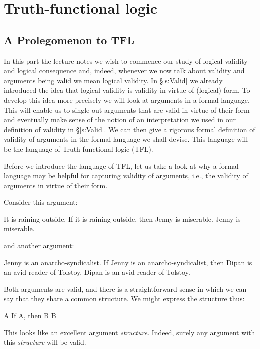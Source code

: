 \part{Truth-functional logic}
\label{ch.TFL}
 
\chapter{A Prolegomenon to TFL}
In this part the lecture notes we wish to commence our study of logical validity and logical consequence and, indeed, whenever we now talk about validity and arguments being valid we mean logical validity. In \S\ref{s:Valid} we already introduced the idea that logical validity is validity in virtue of (logical) form. To develop this idea more precisely we will look at arguments in a formal language. This will enable us to single out arguments that are valid in virtue of their form and eventually make sense of the notion of an interpretation we used in our definition of validity in \S\ref{s:Valid}. We can then give a rigorous formal definition of validity of arguments in the formal language we shall devise. This language will be the language of Truth-functional logic (TFL).

Before we introduce the language of TFL, let us take a look at why a formal language may be helpful for capturing validity of arguments, i.e., the validity of arguments in virtue of their form.

Consider this argument:
	\begin{earg}
		\prem It is raining outside.
		\prem If it is raining outside, then Jenny is miserable.
		\conc Jenny is miserable.
	\end{earg}
and another argument:
	\begin{earg}
		\prem Jenny is an anarcho-syndicalist.
		\prem If Jenny is an anarcho-syndicalist, then Dipan is an avid reader of Tolstoy.
		\conc Dipan is an avid reader of Tolstoy.
	\end{earg}
Both arguments are valid, and there is a straightforward sense in which we can say that they share a common structure. We might express the structure thus:
	\begin{earg}
		\prem A
		\prem If A, then B
		\conc B
	\end{earg}
This looks like an excellent argument \emph{structure}. Indeed, surely any argument with this \emph{structure} will be valid.


